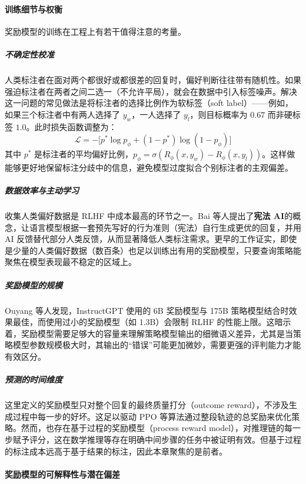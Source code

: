 \paragraph{训练细节与权衡}

奖励模型的训练在工程上有若干值得注意的考量。

\subparagraph{不确定性校准} 人类标注者在面对两个都很好或都很差的回复时，偏好判断往往带有随机性。如果强迫标注者在两者之间二选一（不允许平局），就会在数据中引入标签噪声。解决这一问题的常见做法是将标注者的选择比例作为软标签（soft label）——例如，如果三个标注者中有两人选择了 $y_w$，一人选择了 $y_l$，则目标概率为 $0.67$ 而非硬标签 $1.0$。此时损失函数调整为：
\begin{equation}
    \mathcal{L} = -\big[p^* \log p_\phi + (1-p^*) \log (1-p_\phi)\big]
\end{equation}
其中 $p^*$ 是标注者的平均偏好比例，$p_\phi = \sigma(R_\phi(x, y_w) - R_\phi(x, y_l))$。这样做能够更好地保留标注分歧中的信息，避免模型过度拟合个别标注者的主观偏差。

\subparagraph{数据效率与主动学习} 收集人类偏好数据是 RLHF 中成本最高的环节之一。Bai 等人\cite{bai2022constitutionalai}提出了\textbf{宪法 AI}的概念，让语言模型根据一套预先写好的行为准则（宪法）自行生成更优的回复，并用 AI 反馈替代部分人类反馈，从而显著降低人类标注需求。更早的工作\cite{christiano2017deep}证实，即使是少量的人类偏好数据（数百条）也足以训练出有用的奖励模型，只要查询策略能聚焦在模型表现最不稳定的区域上。

\subparagraph{奖励模型的规模} Ouyang 等人发现，InstructGPT 使用的 6B 奖励模型与 175B 策略模型结合时效果最佳，而使用过小的奖励模型（如 1.3B）会限制 RLHF 的性能上限\cite{ouyang2022traininglanguagemodelsfollow}。这暗示着，奖励模型需要足够大的容量来理解策略模型输出的细微语义差异，尤其是当策略模型参数规模极大时，其输出的“错误”可能更加微妙，需要更强的评判能力才能有效区分。

\subparagraph{预测的时间维度} 这里定义的奖励模型只对整个回复的最终质量打分（outcome reward），不涉及生成过程中每一步的好坏。这足以驱动 PPO 等算法通过整段轨迹的总奖励来优化策略。然而，也存在基于过程的奖励模型（process reward model），对推理链的每一步赋予评分，这在数学推理等存在明确中间步骤的任务中被证明有效\cite{lightman2024let}。但基于过程的标注成本远高于基于结果的标注，因此本章聚焦的是前者。

\paragraph{奖励模型的可解释性与潜在偏差}

